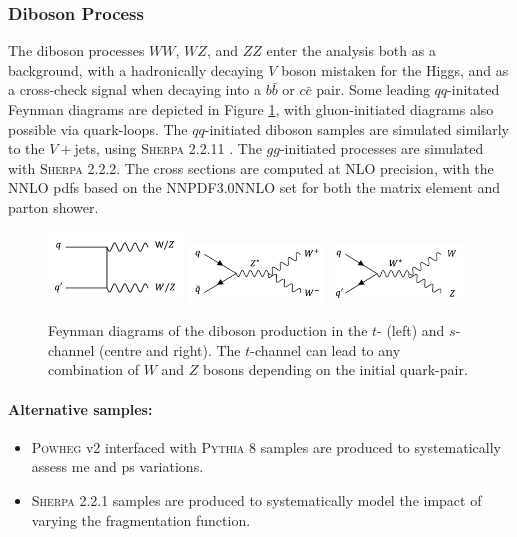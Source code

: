 \subsubsection{Diboson Process}
The diboson processes $WW$, $WZ$, and $ZZ$ enter the analysis both as a background, with a hadronically decaying $V$ boson mistaken for the Higgs, and as a cross-check signal when decaying into a $b\bar{b}$ or $c\bar{c}$ pair. Some leading $qq$-initated Feynman diagrams are depicted in Figure \ref{fig:feyndiV}, with gluon-initiated diagrams also possible via quark-loops. The $qq$-initiated diboson samples are simulated similarly to the $V+$jets, using \textsc{Sherpa} 2.2.11 \cite{10.21468/SciPostPhys.7.3.034}. The $gg$-initiated processes are simulated with \textsc{Sherpa} 2.2.2. The cross sections are computed at NLO precision, with the NNLO \glspl{pdf} based on the NNPDF3.0NNLO set \cite{PDFLHCrun2} for both the matrix element and parton shower.
\begin{figure}[h!]
  \center
  \includegraphics[width=0.32\textwidth]{Images/VH/Feynman/diboson.png}
  \includegraphics[width=0.32\textwidth]{Images/VH/Feynman/diW.png}
  \includegraphics[width=0.32\textwidth]{Images/VH/Feynman/diWZ.png}
  \caption{Feynman diagrams of the diboson production in the $t$- (left) and $s$-channel (centre and right). The $t$-channel can lead to any combination of $W$ and $Z$ bosons depending on the initial quark-pair.}
  \label{fig:feyndiV}
\end{figure}

\paragraph{Alternative samples:}
\begin{itemize}
  \item \textsc{Powheg} v2 interfaced with \textsc{Pythia} 8 samples are produced to systematically assess \gls{me} and \gls{ps} variations. 
  \item \textsc{Sherpa} 2.2.1 samples are produced to systematically model the impact of varying the fragmentation function. 
\end{itemize}

